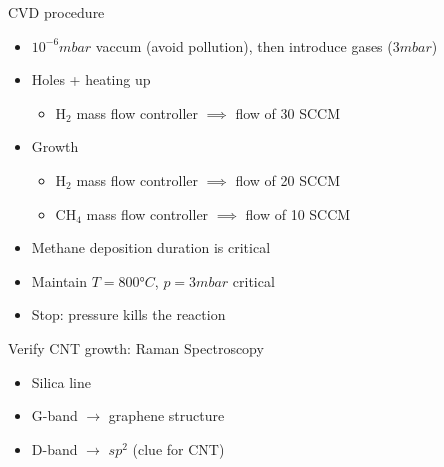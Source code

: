 \documentclass{beamer}
\begin{document}
\begin{frame}{CVD procedure}
\begin{itemize}
    \item $10^{-6} mbar$ vaccum (avoid pollution), then introduce gases ($3 mbar$)
    \item Holes + heating up 
    \begin{itemize}
        \item H$_2$ mass flow controller $\implies$ flow of 30 SCCM
    \end{itemize}
    \item Growth
    \begin{itemize}
        \item H$_2$ mass flow controller $\implies$ flow of 20 SCCM
        \item CH$_4$ mass flow controller $\implies$ flow of 10 SCCM
    \end{itemize}
    \item Methane deposition duration is critical
    \item Maintain $T= 800\text{°}C$, $p = 3 mbar$ critical
    \item Stop: pressure kills the reaction
\end{itemize}

\begin{figure}
    \centering
    \label{fig:CVD}
\end{figure}
\end{frame}

\begin{frame}{Verify CNT growth: Raman Spectroscopy}
    \begin{itemize}
        \item Silica line
        \item G-band \(\rightarrow\) graphene structure
        \item D-band \(\rightarrow\) $sp^2$ (clue for CNT)
    \end{itemize}
    \begin{figure}[H]
        \centering
    \end{figure}
\end{frame}
\end{document}
